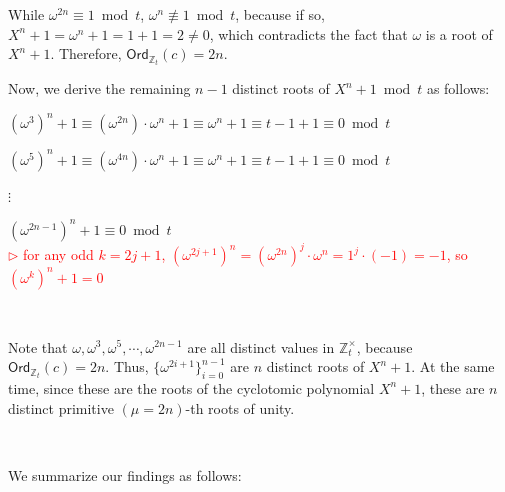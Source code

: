 While $\omega^{2n} \equiv 1 \bmod t$, $\omega^{n} \not\equiv 1 \bmod t$, because if so, $X^n + 1 = \omega^n + 1 = 1 + 1 = 2 \neq 0$, which contradicts the fact that $\omega$ is a root of $X^n + 1$. Therefore, $\textsf{Ord}_{\mathbb{Z}_t}(c) = 2n$. 

Now, we derive the remaining $n-1$ distinct roots of $X^n + 1 \bmod t$ as follows:

$(\omega^3)^n + 1 \equiv (\omega^{2n})\cdot \omega^n + 1 \equiv \omega^n + 1 \equiv t - 1 + 1 \equiv 0 \bmod t$

$(\omega^5)^n + 1 \equiv (\omega^{4n})\cdot \omega^n + 1 \equiv \omega^n + 1 \equiv t - 1 + 1 \equiv 0 \bmod t$

$\vdots$

$(\omega^{2n - 1})^n + 1 \equiv 0 \bmod t$ \\ \textcolor{red}{ $\rhd$ for any odd $k = 2j+1$, $(\omega^{2j+1})^n = (\omega^{2n})^j \cdot \omega^n = 1^j \cdot (-1) = -1$, so $(\omega^k)^n + 1 = 0$}

$ $

Note that $\omega, \omega^3, \omega^5, \cdots, \omega^{2n - 1}$ are all distinct values in $\mathbb{Z}_t^{\times}$, because $\textsf{Ord}_{\mathbb{Z}_t}(c) = 2n$. Thus, $\{\omega^{2i + 1}\}_{i=0}^{n-1}$ are $n$ distinct roots of $X^n + 1$. At the same time, since these are the roots of the cyclotomic polynomial $X^n + 1$, these are $n$ distinct primitive $(\mu=2n)$-th roots of unity. 


$ $


We summarize our findings as follows:

